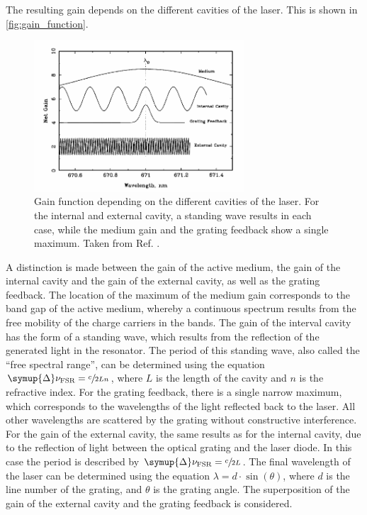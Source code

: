 The resulting gain depends on the different cavities of the laser.
This is shown in \autoref{fig:gain_function}.
\begin{figure}
    \centering
    \includegraphics[width=0.7\textwidth]{content/img/p9_Fig5.png}
    \caption{Gain function depending on the different cavities of the laser.
    For the internal and external cavity,
    a standing wave results in each case,
    while the medium gain and the grating feedback show a single maximum.
    Taken from Ref. \cite{versuchsanleitung}.}
    \label{fig:gain_function}
\end{figure}
A distinction is made between the gain of the active medium,
the gain of the internal cavity and the gain of the external cavity,
as well as the grating feedback.
The location of the maximum of the medium gain corresponds to the band gap of the active medium,
whereby a continuous spectrum results from the free mobility of the charge carriers in the bands.
The gain of the interval cavity has the form of a standing wave,
which results from the reflection of the generated light in the resonator.
The period of this standing wave,
also called the \enquote{free spectral range},
can be determined using the equation $\symup{\Delta}\nu_\text{FSR} = \sfrac{c}{2Ln}$,
where $L$ is the length of the cavity and $n$ is the refractive index.
For the grating feedback, there is a single narrow maximum,
which corresponds to the wavelengths of the light reflected back to the laser.
All other wavelengths are scattered by the grating without constructive interference. %
For the gain of the external cavity, the same results as for the internal cavity,
due to the reflection of light between the optical grating and the laser diode.
In this case the period is described by $\symup{\Delta}\nu_\text{FSR} = \sfrac{c}{2L}$.
The final wavelength of the laser can be determined using the equation $\lambda = d \cdot \sin{(\theta)}$,
where $d$ is the line number of the grating,
and $\theta$ is the grating angle.
The superposition of the gain of the external cavity and the grating feedback is considered.

